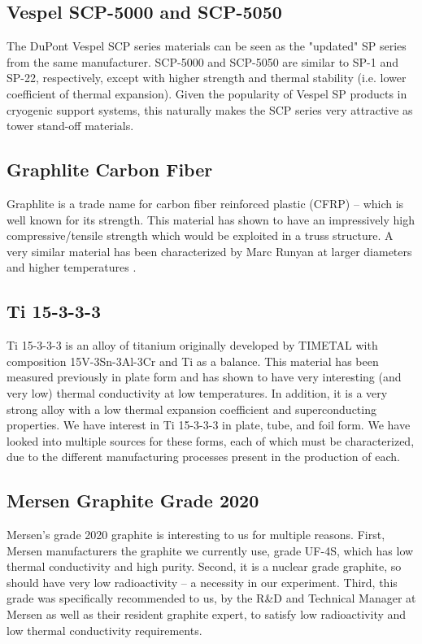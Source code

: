 \documentclass{report}
\begin{document}
\subsection{Vespel SCP-5000 and SCP-5050}
The DuPont Vespel SCP series materials can be seen as the "updated" SP series from the same manufacturer. SCP-5000 and SCP-5050 are similar to SP-1 and SP-22, respectively, except with higher strength and thermal stability (i.e. lower coefficient of thermal expansion). Given the popularity of Vespel SP products in cryogenic support systems, this naturally makes the SCP series very attractive as tower stand-off materials.

\subsection{Graphlite Carbon Fiber}
Graphlite is a trade name for carbon fiber reinforced plastic (CFRP) -- which is well known for its strength. This material has shown to have an impressively high compressive/tensile strength which would be exploited in a truss structure. A very similar material has been characterized by Marc Runyan at larger diameters and higher temperatures \cite{run}.

\subsection{Ti 15-3-3-3}
Ti 15-3-3-3 is an alloy of titanium originally developed by TIMETAL with composition 15V-3Sn-3Al-3Cr and Ti as a balance. This material has been measured previously in plate form and has shown to have very interesting (and very low) thermal conductivity at low temperatures. In addition, it is a very strong alloy with a low thermal expansion coefficient and superconducting properties. We have interest in Ti 15-3-3-3 in plate, tube, and foil form. We have looked into multiple sources for these forms, each of which must be characterized, due to the different manufacturing processes present in the production of each.

\subsection{Mersen Graphite Grade 2020}
Mersen's grade 2020 graphite is interesting to us for multiple reasons. First, Mersen manufacturers the graphite we currently use, grade UF-4S, which has low thermal conductivity and high purity. Second, it is a nuclear grade graphite, so should have very low radioactivity -- a necessity in our experiment. Third, this grade was specifically recommended to us, by the R\&D and Technical Manager at Mersen as well as their resident graphite expert, to satisfy low radioactivity and low thermal conductivity requirements.
\end{document}
